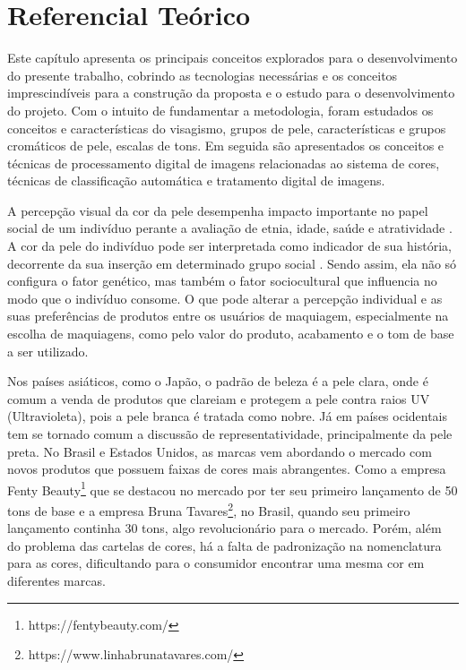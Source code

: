 \chapter{Referencial Teórico}
Este capítulo apresenta os principais conceitos explorados para o desenvolvimento do presente trabalho, cobrindo as tecnologias necessárias e os conceitos imprescindíveis para a construção da proposta e o estudo para o desenvolvimento do projeto. Com o intuito de fundamentar a metodologia, foram estudados os conceitos e características do visagismo, grupos de pele, características e grupos cromáticos de pele, escalas de tons. Em seguida são apresentados os conceitos e técnicas de processamento digital de imagens relacionadas ao sistema de cores, técnicas de classificação automática e tratamento digital de imagens.

A percepção visual da cor da pele desempenha impacto importante no papel social de um indivíduo perante a avaliação de etnia, idade, saúde \cite{Classification_Algorithm_for_Skin_Color_CASCo_A_new_tool} e atratividade \cite{Respostas_Emocionais_Implícitas_Julgamento_da_Atratividade_Facial_em_Faces}. A cor da pele do indivíduo pode ser interpretada como indicador de sua história, decorrente da sua inserção em determinado grupo social \cite{Color_criteria_of_facial_skin_tone_judgment}. Sendo assim, ela não só configura o fator genético, mas também o fator sociocultural que influencia no modo que o indivíduo consome. O que pode alterar a percepção individual e as suas preferências de produtos entre os usuários de maquiagem, especialmente na escolha de maquiagens, como pelo valor do produto, acabamento e o tom de base a ser utilizado.

Nos países asiáticos, como o Japão, o padrão de beleza é a pele clara, onde é comum a venda de produtos que clareiam e protegem a pele contra raios UV (Ultravioleta), pois a pele branca é tratada como nobre. Já em países ocidentais tem se tornado comum a discussão de representatividade, principalmente da pele preta. No Brasil e Estados Unidos, as marcas vem abordando o mercado com novos produtos que possuem faixas de cores mais abrangentes. Como a empresa Fenty Beauty\footnote{https://fentybeauty.com/} que se destacou no mercado por ter seu primeiro lançamento de 50 tons de base e a empresa Bruna Tavares\footnote{https://www.linhabrunatavares.com/}, no Brasil, quando seu primeiro lançamento continha 30 tons, algo revolucionário para o mercado. Porém, além do problema das cartelas de cores, há a falta de padronização na nomenclatura para as cores, dificultando para o consumidor encontrar uma mesma cor em diferentes marcas.

